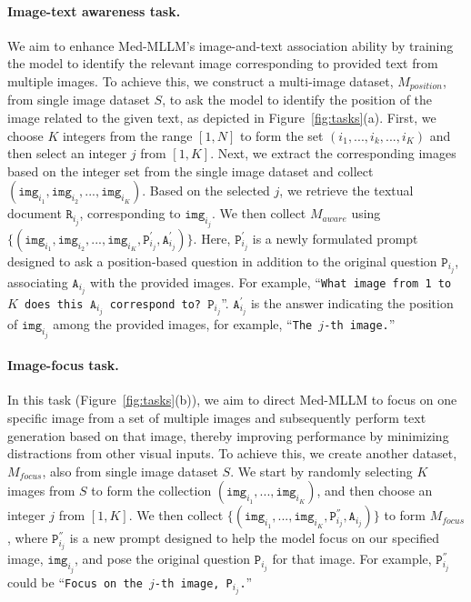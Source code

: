 \paragraph{Image-text awareness task.}
We aim to enhance Med-MLLM's image-and-text association ability by training the model to identify the relevant image corresponding to provided text from multiple images.
To achieve this, we construct a multi-image dataset, $M_{position}$, from single image dataset $S$, to ask the model to identify the position of the image related to the given text, as depicted in Figure~\ref{fig:tasks}(a).
First, we choose $K$ integers from the range $[1,N]$ to form the set $(i_1,..., i_k, ..., i_K)$ and then select an integer $j$ from $[1,K]$.
Next, we extract the corresponding images based on the integer set from the single image dataset and collect $(\texttt{img}_{i_1}, \texttt{img}_{i_2}, ..., \texttt{img}_{i_K}).$
Based on the selected $j$, we retrieve the textual document $\texttt{R}_{i_j}$, corresponding to $\texttt{img}_{i_j}$.
We then collect $M_{aware}$ using $\{(\texttt{img}_{i_1}, \texttt{img}_{i_2}, ..., \texttt{img}_{i_K}, \texttt{P}^{'}_{i_j}, \texttt{A}^{'}_{i_j})\}$. 
Here, $\texttt{P}^{'}_{i_j}$ is a newly formulated prompt designed to ask a position-based question in addition to the original question $\texttt{P}_{i_j}$, associating $\texttt{A}_{i_j}$ with the provided images.
For example, ``\texttt{What image from 1 to $K$ does this $\texttt{A}_{i_j}$ correspond to? $\texttt{P}_{i_j}$}''.
$\texttt{A}^{'}_{i_j}$ is the answer indicating the position of ${\texttt{img}_{i_j}}$ among the provided images, for example, ``\texttt{The $j$-th image.}''


\paragraph{Image-focus task.}
In this task (Figure~\ref{fig:tasks}(b)), we aim to direct Med-MLLM to focus on one specific image from a set of multiple images and subsequently perform text generation based on that image, thereby improving performance by minimizing distractions from other visual inputs.
To achieve this, we create another dataset, $M_{focus}$, also from single image dataset $S$.
We start by randomly selecting $K$ images from $S$ to form the collection $(\texttt{img}_{i_1}, ..., \texttt{img}_{i_K})$, and then choose an integer $j$ from $[1,K]$.
We then collect $\{(\texttt{img}_{i_1}, ..., \texttt{img}_{i_K}, \texttt{P}^{''}_{i_j}, \texttt{A}_{i_j})\}$ to form $M_{focus}$, where  $\texttt{P}^{''}_{i_j}$ is a new prompt designed to help the model focus on our specified image, $\texttt{img}_{i_j}$, and pose the original question $\texttt{P}_{i_j}$ for that image.
For example, $\texttt{P}^{''}_{i_j}$ could be ``\texttt{Focus on the $j$-th image, {P}$_{i_j}$.}''


